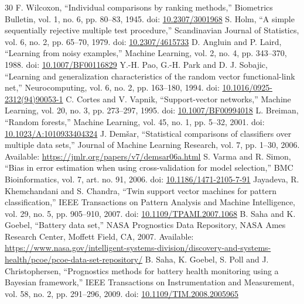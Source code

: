 \documentclass[conference,a4paper]{IEEEtran}
\begin{document}
\begin{thebibliography}{30}
 F. Wilcoxon, ``Individual comparisons by ranking methods,'' Biometrics Bulletin, vol. 1, no. 6, pp. 80--83, 1945. doi: \href{https://doi.org/10.2307/3001968}{10.2307/3001968}
 S. Holm, ``A simple sequentially rejective multiple test procedure,'' Scandinavian Journal of Statistics, vol. 6, no. 2, pp. 65--70, 1979. doi: \href{https://doi.org/10.2307/4615733}{10.2307/4615733}
 D. Angluin and P. Laird, ``Learning from noisy examples,'' Machine Learning, vol. 2, no. 4, pp. 343--370, 1988. doi: \href{https://doi.org/10.1007/BF00116829}{10.1007/BF00116829}
 Y.-H. Pao, G.-H. Park and D. J. Sobajic, ``Learning and generalization characteristics of the random vector functional-link net,'' Neurocomputing, vol. 6, no. 2, pp. 163--180, 1994. doi: \href{https://doi.org/10.1016/0925-2312(94)90053-1}{10.1016/0925-2312(94)90053-1}
 C. Cortes and V. Vapnik, ``Support-vector networks,'' Machine Learning, vol. 20, no. 3, pp. 273--297, 1995. doi: \href{https://doi.org/10.1007/BF00994018}{10.1007/BF00994018}
 L. Breiman, ``Random forests,'' Machine Learning, vol. 45, no. 1, pp. 5--32, 2001. doi: \href{https://doi.org/10.1023/A:1010933404324}{10.1023/A:1010933404324}
 J. Dem\v{s}ar, ``Statistical comparisons of classifiers over multiple data sets,'' Journal of Machine Learning Research, vol. 7, pp. 1--30, 2006. Available: \href{https://jmlr.org/papers/v7/demsar06a.html}{https://jmlr.org/papers/v7/demsar06a.html}
 S. Varma and R. Simon, ``Bias in error estimation when using cross-validation for model selection,'' BMC Bioinformatics, vol. 7, art. no. 91, 2006. doi: \href{https://doi.org/10.1186/1471-2105-7-91}{10.1186/1471-2105-7-91}
 Jayadeva, R. Khemchandani and S. Chandra, ``Twin support vector machines for pattern classification,'' IEEE Transactions on Pattern Analysis and Machine Intelligence, vol. 29, no. 5, pp. 905--910, 2007. doi: \href{https://doi.org/10.1109/TPAMI.2007.1068}{10.1109/TPAMI.2007.1068}
 B. Saha and K. Goebel, ``Battery data set,'' NASA Prognostics Data Repository, NASA Ames Research Center, Moffett Field, CA, 2007. Available: \href{https://www.nasa.gov/intelligent-systems-division/discovery-and-systems-health/pcoe/pcoe-data-set-repository/}{https://www.nasa.gov/intelligent-systems-division/discovery-and-systems-health/pcoe/pcoe-data-set-repository/}
 B. Saha, K. Goebel, S. Poll and J. Christophersen, ``Prognostics methods for battery health monitoring using a Bayesian framework,'' IEEE Transactions on Instrumentation and Measurement, vol. 58, no. 2, pp. 291--296, 2009. doi: \href{https://doi.org/10.1109/TIM.2008.2005965}{10.1109/TIM.2008.2005965}

\end{thebibliography}
\end{document}
